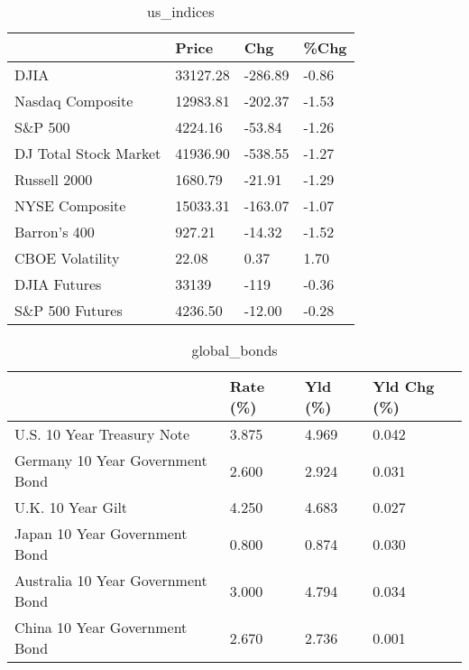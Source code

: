 \documentclass{article}%
\begin{document}
%


\begin{table}[htbp]%
\caption{us\_indices}%
\centering%
\begin{adjustbox}{width=1\textwidth}%
\begin{tabular}{llll}
\toprule
                      &    Price &     Chg &  \%Chg \\
\midrule
                 DJIA & 33127.28 & -286.89 & -0.86 \\
     Nasdaq Composite & 12983.81 & -202.37 & -1.53 \\
              S\&P 500 &  4224.16 &  -53.84 & -1.26 \\
DJ Total Stock Market & 41936.90 & -538.55 & -1.27 \\
         Russell 2000 &  1680.79 &  -21.91 & -1.29 \\
       NYSE Composite & 15033.31 & -163.07 & -1.07 \\
         Barron's 400 &   927.21 &  -14.32 & -1.52 \\
      CBOE Volatility &    22.08 &    0.37 &  1.70 \\
         DJIA Futures &    33139 &    -119 & -0.36 \\
      S\&P 500 Futures &  4236.50 &  -12.00 & -0.28 \\
\bottomrule
\end{tabular}
%
\end{adjustbox}%
\end{table}

%


\begin{table}[htbp]%
\caption{global\_bonds}%
\centering%
\begin{adjustbox}{width=1\textwidth}%
\begin{tabular}{llll}
\toprule
                                  & Rate (\%) & Yld (\%) & Yld Chg (\%) \\
\midrule
       U.S. 10 Year Treasury Note &    3.875 &   4.969 &       0.042 \\
  Germany 10 Year Government Bond &    2.600 &   2.924 &       0.031 \\
                U.K. 10 Year Gilt &    4.250 &   4.683 &       0.027 \\
    Japan 10 Year Government Bond &    0.800 &   0.874 &       0.030 \\
Australia 10 Year Government Bond &    3.000 &   4.794 &       0.034 \\
    China 10 Year Government Bond &    2.670 &   2.736 &       0.001 \\
\bottomrule
\end{tabular}
%
\end{adjustbox}%
\end{table}
\end{document}
